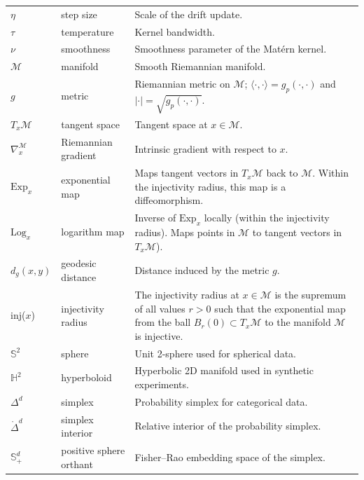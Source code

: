 \documentclass{article}
\theoremstyle{plain}
\newcommand{\Exp}{\mathrm{Exp}}
\newcommand{\Log}{\mathrm{Log}}
\begin{document}
\begin{tabularx}{\textwidth}{llX}
$\eta$ & step size & Scale of the drift update. \\
$\tau$ & temperature & Kernel bandwidth. \\
$\nu$ & smoothness & Smoothness parameter of the Matérn kernel. \\
\midrule
$\mathcal{M}$ & manifold & Smooth Riemannian manifold. \\
$g$ & metric & Riemannian metric on $\mathcal{M}$; $\langle \cdot, \cdot \rangle = g_p(\cdot, \cdot)$ and $|\cdot| = \sqrt{g_p(\cdot, \cdot)}$. \\
$T_x\mathcal{M}$ & tangent space & Tangent space at $x\in\mathcal{M}$. \\
$\nabla_x^{\mathcal{M}}$ & Riemannian gradient & Intrinsic gradient with respect to $x$. \\
$\Exp_x$ & exponential map & Maps tangent vectors in $T_x\mathcal{M}$ back to $\mathcal{M}$. Within the injectivity radius, this map is a diffeomorphism. \\
$\Log_x$ & logarithm map & Inverse of $\Exp_x$ locally (within the injectivity radius). Maps points in $\mathcal{M}$ to tangent vectors in $T_x\mathcal{M}$). \\
$d_g(x,y)$ & geodesic distance & Distance induced by the metric $g$. \\
inj($x$) & injectivity radius & The injectivity radius at $x \in \mathcal{M}$ is the supremum of all values
$r > 0$ such that the exponential map from the ball
$B_r(0) \subset T_x\mathcal{M}$ to the manifold $\mathcal{M}$ is injective. \\
\midrule
$\mathbb{S}^2$ & sphere & Unit 2-sphere used for spherical data. \\
$\mathbb{H}^2$ & hyperboloid & Hyperbolic 2D manifold used in synthetic experiments. \\
$\Delta^d$ & simplex & Probability simplex for categorical data. \\
$\mathring{\Delta}^d$ & simplex interior & Relative interior of the probability simplex. \\
$\mathbb{S}^d_+$ & positive sphere orthant & Fisher--Rao embedding space of the simplex. \\
\bottomrule
\end{tabularx}


\newpage
\end{document}
